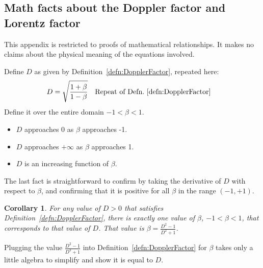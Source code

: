 \documentclass[a4paper]{article}
\theoremstyle{plain}
\newtheorem{corollary}[theorem]{Corollary}
\theoremstyle{definition}
\begin{document}
\subsection{Math facts about the Doppler factor and Lorentz factor}
\label{app:DopplerFactor}

This appendix is restricted to proofs of mathematical relationships.
It makes no claims about the physical meaning of the equations
involved.

Define $D$ as given by Definition~\eqref{defn:DopplerFactor}, repeated
here:
\begin{align*}
D & = \sqrt{ \frac{1 + \beta}{1 - \beta} } & & \text{Repeat of Defn.~\eqref{defn:DopplerFactor}}
\end{align*}
Define it over the entire domain $-1 < \beta < 1$.
\begin{itemize}
\item $D$ approaches 0 as $\beta$ approaches -1.
\item $D$ approaches $+\infty$ as $\beta$ approaches 1.
\item $D$ is an increasing function of $\beta$.
\end{itemize}
The last fact is straightforward to confirm by taking the derivative
of $D$ with respect to $\beta$, and confirming that it is positive
for all $\beta$ in the range $(-1, +1)$.

\begin{corollary}
\label{cor:DdeterminesBeta}
For any value of $D > 0$ that satisfies
Definition~\eqref{defn:DopplerFactor}, there is exactly one value of
$\beta$, $-1 < \beta < 1$,
that corresponds to that value of $D$.
That value is $\beta = \frac{D^2-1}{D^2+1}$.
\end{corollary}
Plugging the value $\frac{D^2-1}{D^2+1}$ into
Definition~\eqref{defn:DopplerFactor} for $\beta$ takes only a little
algebra to simplify and show it is equal to $D$.
\end{document}
